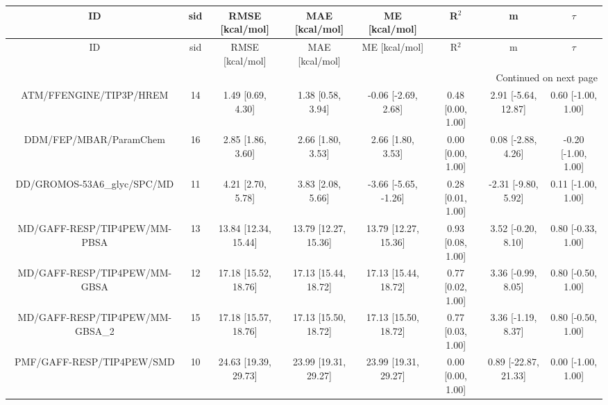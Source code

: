 \documentclass[8pt]{article}
\begin{document}
\begin{center}
\begin{footnotesize}
\begin{longtable}{|cccccccc|}
\toprule
                             ID & sid &      RMSE [kcal/mol] &       MAE [kcal/mol] &        ME [kcal/mol] &             R$^2$ &                    m &              $\tau$ \\
\midrule
\endfirsthead

\toprule
                             ID & sid &      RMSE [kcal/mol] &       MAE [kcal/mol] &        ME [kcal/mol] &             R$^2$ &                    m &              $\tau$ \\
\midrule
\endhead
\midrule
\multicolumn{8}{r}{{Continued on next page}} \\
\midrule
\endfoot

\bottomrule
\endlastfoot
        ATM/FFENGINE/TIP3P/HREM &  14 &    1.49 [0.69, 4.30] &    1.38 [0.58, 3.94] &  -0.06 [-2.69, 2.68] & 0.48 [0.00, 1.00] &  2.91 [-5.64, 12.87] &  0.60 [-1.00, 1.00] \\
         DDM/FEP/MBAR/ParamChem &  16 &    2.85 [1.86, 3.60] &    2.66 [1.80, 3.53] &    2.66 [1.80, 3.53] & 0.00 [0.00, 1.00] &   0.08 [-2.88, 4.26] & -0.20 [-1.00, 1.00] \\
    DD/GROMOS-53A6\_glyc/SPC/MD &  11 &    4.21 [2.70, 5.78] &    3.83 [2.08, 5.66] & -3.66 [-5.65, -1.26] & 0.28 [0.01, 1.00] &  -2.31 [-9.80, 5.92] &  0.11 [-1.00, 1.00] \\
   MD/GAFF-RESP/TIP4PEW/MM-PBSA &  13 & 13.84 [12.34, 15.44] & 13.79 [12.27, 15.36] & 13.79 [12.27, 15.36] & 0.93 [0.08, 1.00] &   3.52 [-0.20, 8.10] &  0.80 [-0.33, 1.00] \\
   MD/GAFF-RESP/TIP4PEW/MM-GBSA &  12 & 17.18 [15.52, 18.76] & 17.13 [15.44, 18.72] & 17.13 [15.44, 18.72] & 0.77 [0.02, 1.00] &   3.36 [-0.99, 8.05] &  0.80 [-0.50, 1.00] \\
MD/GAFF-RESP/TIP4PEW/MM-GBSA\_2 &  15 & 17.18 [15.57, 18.76] & 17.13 [15.50, 18.72] & 17.13 [15.50, 18.72] & 0.77 [0.03, 1.00] &   3.36 [-1.19, 8.37] &  0.80 [-0.50, 1.00] \\
      PMF/GAFF-RESP/TIP4PEW/SMD &  10 & 24.63 [19.39, 29.73] & 23.99 [19.31, 29.27] & 23.99 [19.31, 29.27] & 0.00 [0.00, 1.00] & 0.89 [-22.87, 21.33] &  0.00 [-1.00, 1.00] \\
\end{longtable}
\end{footnotesize}
\end{center}
\end{document}
